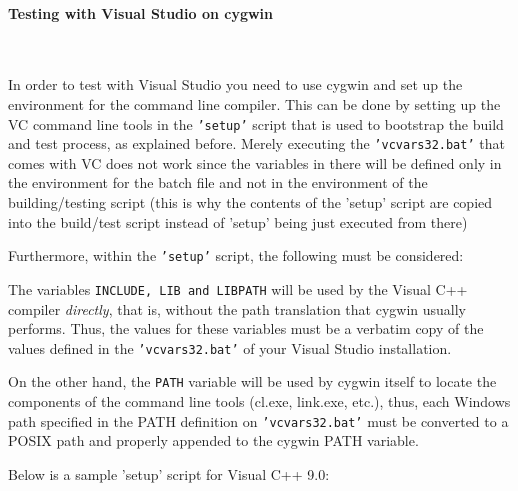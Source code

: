 \paragraph{Testing with Visual Studio on cygwin} ~

In order to test with Visual Studio you need to use cygwin and set up
the environment for the command line compiler. This can be done
by setting up the VC command line tools in the {\tt 'setup'} script
that is used to bootstrap the build and test process, as explained before.
Merely executing the {\tt 'vcvars32.bat'} that comes with VC does not work 
since the variables in there will be defined only in the environment for the batch 
file and not in the environment of the building/testing script (this is why
the contents of the 'setup' script are copied into the build/test script 
instead of 'setup' being just executed from there)

Furthermore, within the {\tt 'setup'} script, the following must be
considered: 

The variables {\tt INCLUDE, LIB and LIBPATH} will be used by the Visual C++ compiler
{\em directly}, that is, without the path translation that cygwin usually performs.
Thus, the values for these variables must be a verbatim copy of the values defined in
the {\tt 'vcvars32.bat'} of your Visual Studio installation.

On the other hand, the {\tt PATH} variable will be used by cygwin itself to locate the
components of the command line tools (cl.exe, link.exe, etc.), thus, each Windows
path specified in the PATH definition on {\tt 'vcvars32.bat'} must be converted to a
POSIX path and properly appended to the cygwin PATH variable.

Below is a sample 'setup' script for Visual C++ 9.0:

